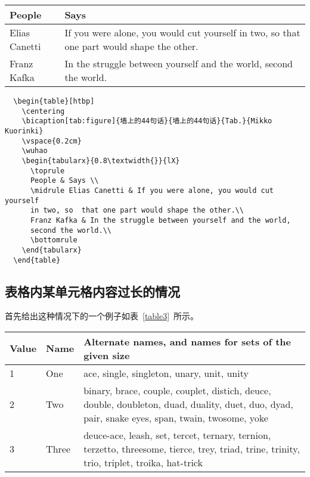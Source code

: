 \begin{table}[htbp]
  \centering
  \vspace{0.2cm}
  \wuhao
  \begin{tabularx}{0.8\textwidth{}}{lX}
    \toprule
    People & Says \\
    \midrule
    Elias Canetti & If you were alone, you would cut yourself in two, so
    that one part would shape the other.\\
    Franz Kafka & In the struggle between yourself and the world,
    second the world.\\
    \bottomrule
  \end{tabularx}
\end{table}

\begin{lstlisting}
  \begin{table}[htbp]
    \centering
    \bicaption[tab:figure]{墙上的44句话}{墙上的44句话}{Tab.}{Mikko Kuorinki}
    \vspace{0.2cm}
    \wuhao
    \begin{tabularx}{0.8\textwidth{}}{lX}
      \toprule
      People & Says \\
      \midrule Elias Canetti & If you were alone, you would cut yourself
      in two, so  that one part would shape the other.\\
      Franz Kafka & In the struggle between yourself and the world,
      second the world.\\
      \bottomrule
    \end{tabularx}
  \end{table}
\end{lstlisting}

\subsection{表格内某单元格内容过长的情况}

首先给出这种情况下的一个例子如表~\ref{table3}~所示。
\begin{table}[htbp]
  \centering
{}\vspace{0.5em}\wuhao
\begin{tabularx}{0.7\textwidth}{llX}
\toprule[1.5pt]
Value & Name & Alternate names, and names for sets of the given size\\\midrule[1pt]
1 & One & ace, single, singleton, unary, unit, unity\\
2 & Two & binary, brace, couple, couplet, distich, deuce, double, doubleton, duad, duality, duet, duo, dyad, pair, snake eyes, span, twain, twosome, yoke\\
3 & Three & deuce-ace, leash, set, tercet, ternary, ternion, terzetto, threesome, tierce, trey, triad, trine, trinity, trio, triplet, troika, hat-trick\\\bottomrule[1.5pt]
\end{tabularx}
\end{table}


